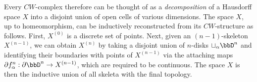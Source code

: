 

Every $CW$-complex therefore can be thought of as a \emph{decomposition} of a Hausdorff space $X$ into a disjoint union of open cells of various dimensions. The space $X$, up to homeomorphism, can be inductively reconstructed from its $CW$-structure as follows. First, $X^{(0)}$ is a discrete set of points. Next, given an $(n-1)$-skeleton $X^{(n-1)}$, we can obtain $X^{(n)}$ by taking a disjoint union of $n$-disks $\sqcup_\alpha \bbD^n$ and identifying their boundaries with points of $X^{(n-1)}$ via the attaching maps $\partial f_\alpha^n:\partial \bbD^n\to X^{(n-1)}$, which are required to be continuous. The space $X$ is then the inductive union of all skeleta with the final topology.


